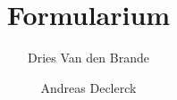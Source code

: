\usepackage[dutch]{babel}
\usepackage{amsmath}
\usepackage{physics}

\title{Formularium}
\author{Dries Van den Brande \and Andreas Declerck}
